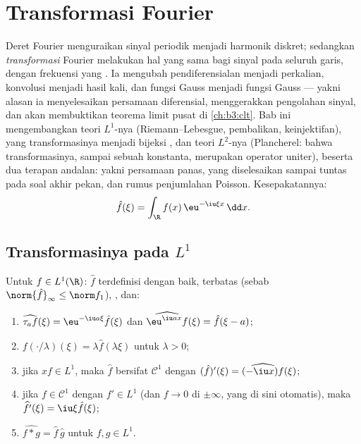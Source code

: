 \chapter{Transformasi Fourier}\label{ch:b3:fouriertransform}

Deret Fourier menguraikan sinyal periodik menjadi harmonik
diskret; sedangkan \emph{transformasi} Fourier melakukan hal yang sama bagi
sinyal pada seluruh garis, dengan frekuensi yang . Ia
mengubah pendiferensialan menjadi perkalian, konvolusi menjadi
hasil kali, dan fungsi Gauss menjadi fungsi Gauss --- yakni alasan ia
menyelesaikan persamaan diferensial, menggerakkan pengolahan sinyal, dan
akan membuktikan teorema limit pusat di \cref{ch:b3:clt}. Bab
ini mengembangkan teori $L^1$-nya (Riemann--Lebesgue,
pembalikan, keinjektifan),  yang
transformasinya menjadi bijeksi , dan teori $L^2$-nya
(Plancherel: bahwa transformasinya, sampai sebuah konstanta, merupakan operator
uniter), beserta dua terapan andalan: yakni persamaan panas,
yang diselesaikan sampai tuntas pada soal akhir pekan, dan rumus penjumlahan
Poisson. Kesepakatannya:
\[
\hat f(\xi) = \int_\R f(x)\,\eu^{-\iu\xi x}\,\dd x .
\]

\section{Transformasinya pada \texorpdfstring{$L^1$}{L1}}

\begin{proposition}\label{prop:b3:fouriertransform:basic}
Untuk $f \in L^1(\R)$: $\hat f$ terdefinisi dengan baik, terbatas
(sebab $\norm{\hat f}_\infty \leq \norm f_1$), , dan:
\begin{enumerate}
  \item $\widehat{\tau_af}(\xi) = \eu^{-\iu a\xi}\hat f(\xi)$
        dan $\widehat{\eu^{\iu ax}f}(\xi) = \hat f(\xi - a)$;
  \item $\widehat{f(\cdot/\lambda)}(\xi) = \lambda\hat
        f(\lambda\xi)$ untuk $\lambda > 0$;
  \item jika $xf \in L^1$, maka $\hat f$ bersifat $\mathcal C^1$ dengan
        $(\hat f)'(\xi) = \widehat{(-\iu x)f}(\xi)$;
  \item jika $f \in \mathcal C^1$ dengan $f' \in L^1$ (dan $f \to
        0$ di $\pm\infty$, yang di sini otomatis), maka
        $\widehat{f'}(\xi) = \iu\xi\hat f(\xi)$;
  \item $\widehat{f * g} = \hat f\,\hat g$ untuk $f, g \in L^1$.
\end{enumerate}
\end{proposition}

